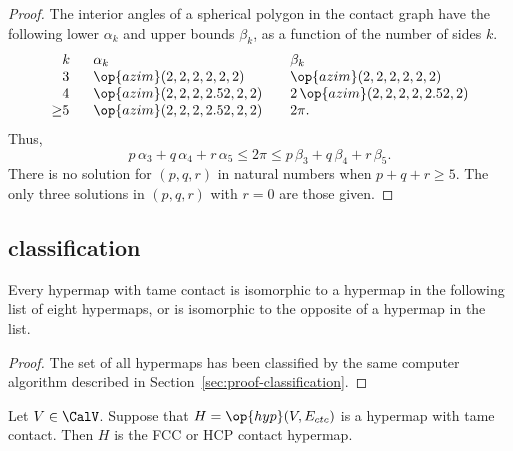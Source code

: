 \begin{proof} The interior angles of a spherical polygon in the
  contact graph have the following lower $\alpha_k$ and upper bounds
  $\beta_k$, as a function of the number of sides $k$.
\[
\begin{array}{llll}
  \phantom{\ge}k~~&\alpha_k & \beta_k\\
  \phantom{\ge}3~~&\op{azim}(2,2,2,2,2,2)  &\op{azim}(2,2,2,2,2,2)\\
  \phantom{\ge}4~~&\op{azim}(2,2,2,2.52,2,2) &2\,\op{azim}(2,2,2,2,2.52,2)\\
  {\ge}5~~& \op{azim}(2,2,2,2.52,2,2) ~~~& 2\pi.
\end{array}
\]
Thus,
\[
  p\,\alpha_3 + q\,\alpha_4 +r\, \alpha_5 
\le 2\pi \le p\,\beta_3 + q\,\beta_4 + r \,\beta_5.
\]
There is no solution for
$(p,q,r)$ in natural numbers when $p+q+r\ge 5$.
The only three solutions in $(p,q,r)$ with $r=0$
are those given. 
\end{proof}



\subsection{classification}


\begin{lemma}
  \label{lemma:contact-classification} Every hypermap with tame
  contact is isomorphic to a hypermap in the following list of eight
  hypermaps, or is isomorphic to the opposite of a hypermap in the
  list.  %
\end{lemma}

\begin{proof}
  The set of all hypermaps has been classified by the same computer
  algorithm described in Section~\ref{sec:proof-classification}.
\end{proof}



\begin{lemma}[]\label{lemma:fcc-ft} Let $V\in \CalV$.
  Suppose that $H=\op{hyp}(V,E_{ctc})$ is a hypermap with tame
  contact.  Then $H$ is the FCC or HCP contact hypermap.
\end{lemma}

